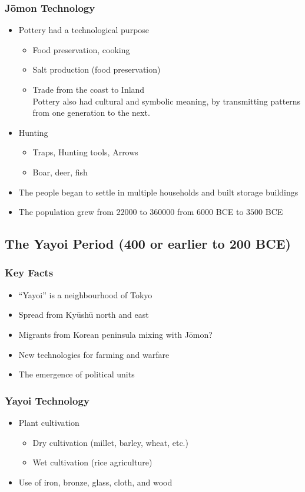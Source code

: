 \documentclass[class=article, crop=false]{standalone}
\begin{document}
  \subsubsection{J\=omon Technology}
  \begin{itemize}
    \item Pottery had a technological purpose
    \begin{itemize}
      \item Food preservation, cooking
      \item Salt production (food preservation)
      \item Trade from the coast to Inland \\[10pt]
      Pottery also had cultural and symbolic meaning, by transmitting patterns from one generation to the next.
    \end{itemize}
    \item Hunting
    \begin{itemize}
      \item Traps, Hunting tools, Arrows
      \item Boar, deer, fish
    \end{itemize}
    \item The people began to settle in multiple households and built storage buildings
    \item The population grew from $22000$ to $360000$ from $6000$ BCE to $3500$ BCE
  \end{itemize}
  \subsection{The Yayoi Period (400 or earlier to 200 BCE)}
  \subsubsection{Key Facts}
  \begin{itemize}
    \item ``Yayoi'' is a neighbourhood of Tokyo
    \item Spread from Ky\=ush\=u north and east
    \item Migrants from Korean peninsula mixing with J\=omon?
    \item New technologies for farming and warfare
    \item The emergence of political units
  \end{itemize}
  \subsubsection{Yayoi Technology}
  \begin{itemize}
    \item Plant cultivation
    \begin{itemize}
      \item Dry cultivation (millet, barley, wheat, etc.)
      \item Wet cultivation (rice agriculture)
    \end{itemize}
    \item Use of iron, bronze, glass, cloth, and wood
  \end{itemize}
\end{document}

